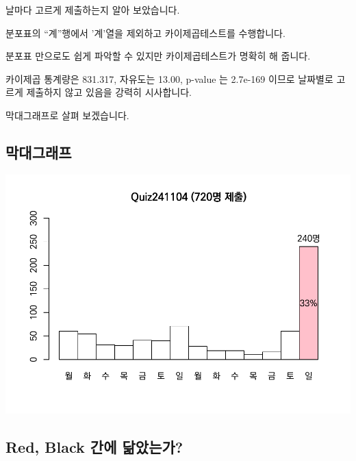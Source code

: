 \documentclass[
]{book}
\begin{document}
날마다 고르게 제출하는지 알아 보았습니다.

분포표의 ``계''행에서 '계'열을 제외하고 카이제곱테스트를 수행합니다.

분포표 만으로도 쉽게 파악할 수 있지만 카이제곱테스트가 명확히 해 줍니다.

카이제곱 통계량은 831.317, 자유도는 13.00, p-value 는 2.7e-169 이므로 날짜별로 고르게 제출하지 않고 있음을 강력히 시사합니다.

막대그래프로 살펴 보겠습니다.

\subsection{막대그래프}\label{uxb9c9uxb300uxadf8uxb798uxd504-11}

\includegraphics{Quiz_report_2025_files/figure-latex/unnamed-chunk-306-1.pdf}

\subsection{Red, Black 간에 닮았는가?}\label{red-black-uxac04uxc5d0-uxb2eeuxc558uxb294uxac00-9}
\end{document}
